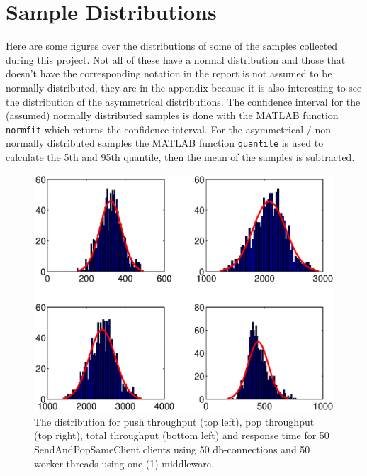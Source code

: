 \documentclass{article}
\begin{document}
        \section{Sample Distributions}
        Here are some figures over the distributions of some of the samples collected during this project. Not all of these have a normal distribution and those that doesn't have the corresponding notation in the report is not assumed to be normally distributed, they are  in the appendix because it is also interesting to see the distribution of the asymmetrical distributions. The confidence interval for the (assumed) normally distributed samples is done with the MATLAB function \texttt{normfit} which returns the confidence interval. For the asymmetrical / non-normally distributed samples the MATLAB function \texttt{quantile} is used to calculate the 5th and 95th quantile, then the mean of the samples is subtracted.
        \begin{figure}[hbtp]
        \centering
        \centerline{\includegraphics[scale=0.5]{img/histfit_1middleware_push_rop_total_resptime.eps}}
        \caption{The distribution for push throughput (top left), pop throughput (top right), total throughput (bottom left) and response time for 50 SendAndPopSameClient clients using 50 db-connections and 50 worker threads using one (1) middleware.}
        \end{figure}
        
\end{document}
